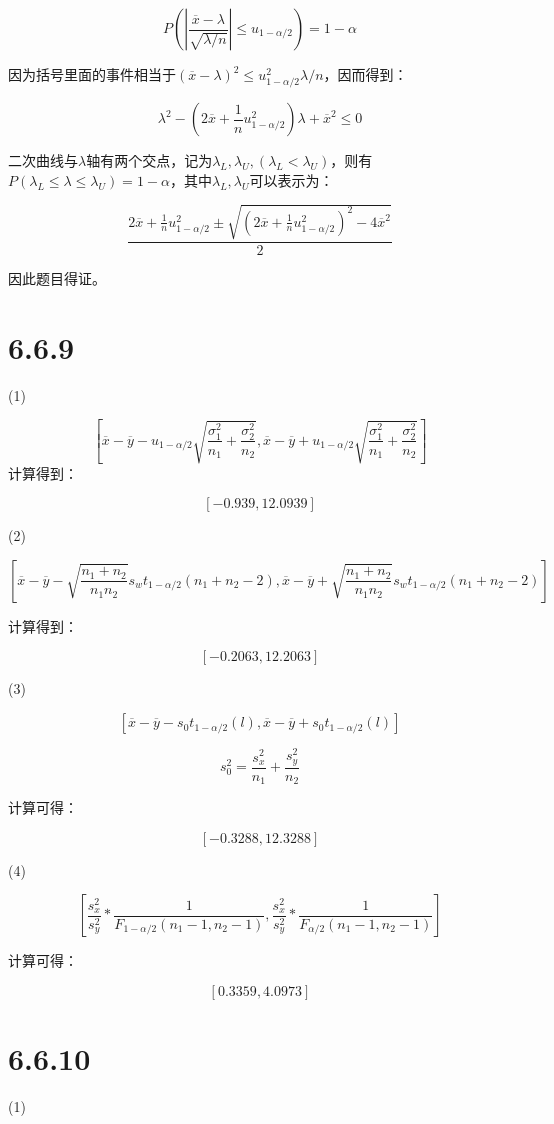 \documentclass{article}
\begin{document}
$$P(|\frac{\overline x -\lambda}{\sqrt{\lambda/n}}|\leq u_{1-\alpha/2})=1-\alpha$$

因为括号里面的事件相当于$(\overline x-\lambda )^2\leq u^2_{1-\alpha/2}\lambda/n$，因而得到：

$$\lambda^2-(2\overline x+\frac1nu^2_{1-\alpha/2})\lambda+\overline x^2\leq 0$$

二次曲线与$\lambda$轴有两个交点，记为$\lambda_L,\lambda_U,(\lambda_L<\lambda_U)$，则有$P(\lambda_L\leq\lambda\leq\lambda_U)=1-\alpha$，其中$\lambda_L,\lambda_U$可以表示为：

$$\frac{2\overline x+\frac1nu^2_{1-\alpha/2}\pm \sqrt{(2\overline x+\frac1nu^2_{1-\alpha/2})^2-4\overline x^2}}{2}$$

因此题目得证。

\section{6.6.9}

(1)

$$[\overline x-\overline y - u_{1-\alpha/2} \sqrt{\frac{\sigma_1^2}{n_1} + \frac{\sigma_2^2}{n_2}},\overline x-\overline y +u_{1-\alpha/2} \sqrt{\frac{\sigma_1^2}{n_1} + \frac{\sigma_2^2}{n_2}}]$$
计算得到：

$$[-0.939,12.0939]$$

(2)

$$[\overline x-\overline y-\sqrt{\frac{n_1+n_2}{n_1n_2}}s_wt_{1-\alpha/2}(n_1+n_2-2),\overline x-\overline y+\sqrt{\frac{n_1+n_2}{n_1n_2}}s_wt_{1-\alpha/2}(n_1+n_2-2)]$$

计算得到：

$$[-0.2063,12.2063]$$

(3)

$$[\overline x- \overline y - s_0t_{1-\alpha/2}(l), \overline x- \overline y +s_0t_{1-\alpha/2}(l)]$$

$$s_0^2=\frac{s_x^2}{n_1}+\frac{s_y^2}{n_2}$$

计算可得：

$$[-0.3288,12.3288]$$

(4)

$$[\frac{s_x^2}{s_y^2}*\frac{1}{F_{1-\alpha/2}(n_1-1,n_2-1)},\frac{s_x^2}{s_y^2}*\frac{1}{F_{\alpha/2}(n_1-1,n_2-1)}]$$

计算可得：

$$[0.3359,4.0973]$$



\section{6.6.10}
(1)
\end{document}
